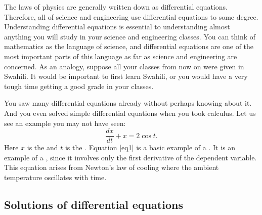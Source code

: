 The laws of physics are generally written down as differential
equations.  Therefore, all of science and engineering use
differential equations to some degree.  Understanding
differential equations is essential to understanding almost anything you will
study in your science and engineering classes.
You can think of mathematics as the language of science, and
differential equations are one of the most important parts of this
language as far as science and engineering are concerned.  As an analogy,
suppose all your classes from now on were given in Swahili.  
It would be important to first learn Swahili, or you would have a very
tough time getting a good grade in your classes.

You saw many
differential equations already without perhaps knowing about it.
And you even solved simple
differential equations when you took calculus.
Let us see an example you may not have seen:
\begin{equation} \label{eq1}
\frac{dx}{dt} + x = 2 \cos t .
\end{equation}
Here $x$ is the \emph{} and $t$ is the
\emph{}.
Equation \eqref{eq1}
is a basic example of a \emph{}.  It
is an example of a \emph{}, since
it involves only the first derivative of the dependent variable.  This 
equation arises from Newton's law of cooling where the ambient
temperature oscillates with time.

\subsection{Solutions of differential equations}

